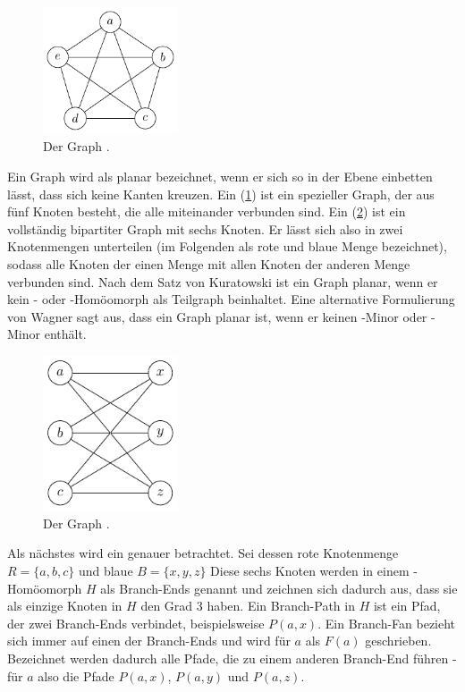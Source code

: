 \begin{figure}
  \includegraphics[width=4cm]{bilder/K_5.pdf}
  \caption{Der Graph \kf.}
  \label{fig:K5}
\end{figure}
Ein Graph wird als planar bezeichnet, wenn er sich so in der Ebene einbetten lässt, dass sich keine Kanten kreuzen.
Ein \kf (\sAbb \ref{fig:K5}) ist ein spezieller Graph, der aus fünf Knoten besteht, die alle miteinander verbunden sind.
Ein \kdd (\sAbb \ref{fig:K33}) ist ein vollständig bipartiter Graph mit sechs Knoten.
Er lässt sich also in zwei Knotenmengen unterteilen (im Folgenden als rote und blaue Menge bezeichnet), sodass alle Knoten der einen Menge mit allen Knoten der anderen Menge verbunden sind.
Nach dem Satz von Kuratowski ist ein Graph planar, wenn er kein \kf- oder \kdd-Homöomorph als Teilgraph beinhaltet.
Eine alternative Formulierung von Wagner sagt aus, dass ein Graph planar ist, wenn er keinen \kf-Minor oder \kdd-Minor enthält.\cite{Die12}
\begin{figure}
  \includegraphics[width=4cm]{bilder/K_33.pdf}
  \caption{Der Graph \kdd.}
  \label{fig:K33}
\end{figure}

Als nächstes wird ein \kdd genauer betrachtet.
Sei dessen rote Knotenmenge $R = \{a, b, c\}$ und blaue $B = \{x, y, z\}$
Diese sechs Knoten werden in einem \kdd-Homöomorph $H$ als Branch-Ends genannt und zeichnen sich dadurch aus, dass sie als einzige Knoten in $H$ den Grad 3 haben.
Ein Branch-Path in $H$ ist ein Pfad, der zwei Branch-Ends verbindet, beispielsweise $P(a, x)$.
Ein Branch-Fan bezieht sich immer auf einen der Branch-Ends und wird \zB für $a$ als $F(a)$ geschrieben.
Bezeichnet werden dadurch alle Pfade, die zu einem anderen Branch-End führen - für $a$ also die Pfade $P(a, x)$, $P(a, y)$ und $P(a, z)$.


